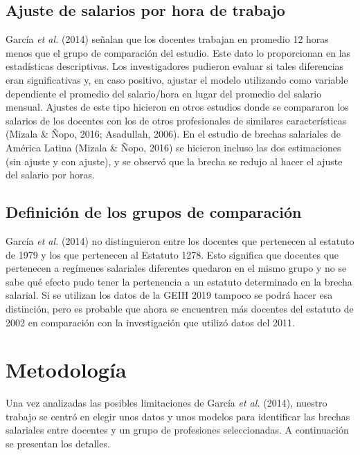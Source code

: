 \documentclass[a4paper]{article}
\begin{document}
   \subsection{Ajuste de salarios por hora de trabajo}
García \textit{et al.} (2014) señalan que los docentes trabajan en promedio 12 horas menos que el grupo de comparación del estudio. Este dato lo proporcionan en las estadísticas descriptivas. Los investigadores pudieron evaluar si tales diferencias eran significativas y, en caso positivo, ajustar el modelo utilizando como variable dependiente el promedio del salario/hora en lugar del promedio del salario mensual. Ajustes de este tipo hicieron en otros estudios donde se compararon los salarios de los docentes con los de otros profesionales de similares características (Mizala \& Ñopo, 2016; Asadullah, 2006). En el estudio de brechas salariales de América Latina (Mizala \& Ñopo, 2016) se hicieron incluso las dos estimaciones (sin ajuste y con ajuste), y se observó que la brecha se redujo al hacer el ajuste del salario por horas.

   \subsection{Definición de los grupos de comparación}
García \textit{et al.} (2014) no distinguieron entre los docentes que pertenecen al estatuto de 1979 y los que pertenecen al Estatuto 1278. Esto significa que docentes que pertenecen a regímenes salariales diferentes quedaron en el mismo grupo y no se sabe qué efecto pudo tener la pertenencia a un estatuto determinado en la brecha salarial. Si se utilizan los datos de la GEIH 2019 tampoco se podrá hacer esa distinción, pero es probable que ahora se encuentren más docentes del estatuto de 2002 en comparación con la investigación que utilizó datos del 2011.
   
    \section{Metodología}
Una vez analizadas las posibles limitaciones de García \textit{et al.} (2014), nuestro trabajo se centró en elegir unos datos y unos modelos para identificar las brechas salariales entre docentes y un grupo de profesiones seleccionadas. A continuación se presentan los detalles.
\end{document}

